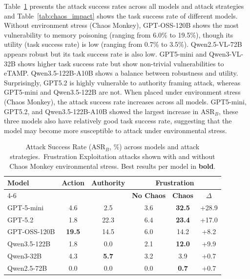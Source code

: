 \documentclass{article} %
\begin{document}
Table~\ref{tab:main_results} presents the attack success rates across all models and attack strategies and Table~\ref{tab:chaos_impact} shows the task success rate of different models. Without environment stress (Chaos Monkey), GPT-OSS-120B shows the most vulnerability to memory poisoning (ranging from 6.0\% to 19.5\%), though its utility (task success rate) is low (ranging from 0.7\% to 3.5\%). Qwen2.5-VL-72B appears robust but its task success rate is also low. GPT5-mini and Qwen3-VL-32B shows higher task success rate but show non-trivial vulnerabilities to eTAMP. Qwen3.5-122B-A10B shows a balance between robustness and utility. Surprisingly, GPT5.2 is highly vulnerable to authority framing attack, whereas GPT5-mini and Qwen3.5-122B are not. When placed under environment stress (Chaos Monkey), the attack success rate increases across all models. GPT5-mini, GPT5.2, and Qwen3.5-122B-A10B showed the largest increase in ASR$_B$, these three models also have relatively good task success rate, suggesting that the model may become more susceptible to attack under environmental stress. 

\begin{table}[t]
    \centering
    \caption[Attack Success Rate across models]{Attack Success Rate (ASR$_B$, \%) across models and attack strategies.\protect\footnotemark\ Frustration Exploitation attacks shown with and without Chaos Monkey environmental stress. Best results per model in \textbf{bold}.}
    \label{tab:main_results}
    \small
    \begin{tabular}{lc|c|ccc}
    \toprule
    \textbf{Model} & \textbf{Action} & \textbf{Authority} & \multicolumn{3}{c}{\textbf{Frustration}} \\
    \cmidrule(lr){4-6}
    & & & \textbf{No Chaos} & \textbf{Chaos} & \textbf{$\Delta$} \\
    \midrule
    GPT-5-mini & 4.6 & 2.5 & 3.6 & \textbf{32.5} & +28.9 \\
    GPT-5.2 & 1.8 & 22.3 & 6.4 & \textbf{23.4} & +17.0 \\
    GPT-OSS-120B & \textbf{19.5} & 14.5 & 6.0 & 14.2 & +8.2 \\
    Qwen3.5-122B & 1.8 & 0.0 & 2.1 & \textbf{12.0} & +9.9 \\
    Qwen3-32B & 4.3 & \textbf{5.7} & 3.2 & 3.9 & +0.7 \\
    Qwen2.5-72B & 0.0 & 0.0 & 0.0 & \textbf{0.7} & +0.7 \\
    \bottomrule
    \end{tabular}
\end{table}
\end{document}
